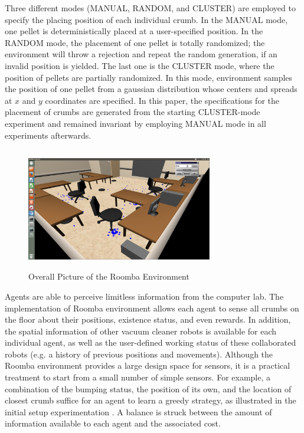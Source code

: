 \documentclass[conference]{IEEEtran}
\begin{document}
Three different modes (MANUAL, RANDOM, and CLUSTER) are employed to specify
the placing position of each individual crumb.
In the MANUAL mode, one pellet is deterministically placed at a user-specified
position. 
In the RANDOM mode, the placement of one pellet is totally randomized; the
environment will throw a rejection and repeat the random generation, if an
invalid position is yielded. The last one is the CLUSTER mode, where the
position of pellets are partially randomized. In this mode,
environment samples the position of one pellet from a gaussian distribution
whose centers and spreads at $x$ and $y$ coordinates are specified. 
In this paper, the specifications for the placement of crumbs are generated
from the starting CLUSTER-mode experiment and remained invariant by
employing MANUAL mode in all experiments afterwards.

\begin{figure}[!t]
\centering
\includegraphics[width=3.2in,height=2.1in]{./figures/roombas/roomba2.png}
\caption{Overall Picture of the Roomba Environment}
\label{roomba:world}
\end{figure}

Agents are able to  perceive limitless information from the computer lab. 
The implementation of Roomba environment allows each agent to sense all crumbs on
the floor about their positions, existence status, and even rewards. In
addition, the spatial information of other vacuum cleaner robots is available
for each individual agent, as well as the user-defined working status of these 
collaborated robots (e.g. a history of previous positions and movements).
Although the Roomba environment provides a large design space for sensors, it
is a practical treatment to start from a small number of
simple sensors. For example, a combination of the bumping status, the position of
its own, and the location of closest crumb suffice for an agent to learn a
greedy strategy, as illustrated in the initial setup experimentation .
A balance is struck between the amount of information available to each agent
and the associated cost.
\end{document}
